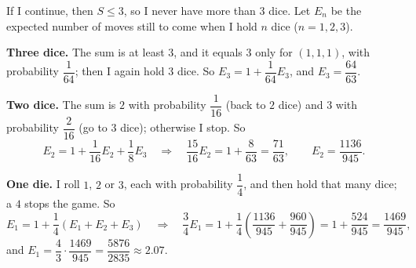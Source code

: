 If I continue, then $S\le3$, so I never have more than $3$ dice. Let $E_n$ be the expected number of moves still to come when I hold $n$ dice ($n=1,2,3$).

\textbf{Three dice.} The sum is at least $3$, and it equals $3$ only for $(1,1,1)$, with probability $\dfrac{1}{64}$; then I again hold $3$ dice. So $E_3=1+\dfrac{1}{64}E_3$, and $E_3=\dfrac{64}{63}$.

\textbf{Two dice.} The sum is $2$ with probability $\dfrac1{16}$ (back to $2$ dice) and $3$ with probability $\dfrac{2}{16}$ (go to $3$ dice); otherwise I stop. So
\[E_2=1+\dfrac1{16}E_2+\dfrac18E_3\quad\Longrightarrow\quad\dfrac{15}{16}E_2=1+\dfrac{8}{63}=\dfrac{71}{63},\qquad E_2=\dfrac{1136}{945}.\]

\textbf{One die.} I roll $1$, $2$ or $3$, each with probability $\dfrac14$, and then hold that many dice; a $4$ stops the game. So
\[E_1=1+\dfrac14\left(E_1+E_2+E_3\right)\quad\Longrightarrow\quad\dfrac34E_1=1+\dfrac14\left(\dfrac{1136}{945}+\dfrac{960}{945}\right)=1+\dfrac{524}{945}=\dfrac{1469}{945},\]
and $E_1=\dfrac{4}{3}\cdot\dfrac{1469}{945}=\boxed{\dfrac{5876}{2835}}\approx2.07$.
